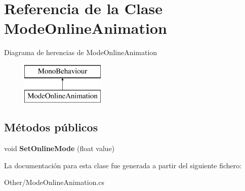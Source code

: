 \hypertarget{class_mode_online_animation}{}\section{Referencia de la Clase Mode\+Online\+Animation}
\label{class_mode_online_animation}
Diagrama de herencias de Mode\+Online\+Animation\begin{figure}[H]
\begin{center}
\leavevmode
\includegraphics[height=2.000000cm]{class_mode_online_animation}
\end{center}
\end{figure}
\subsection*{Métodos públicos}
\begin{DoxyCompactItemize}
\item 
\mbox{\label{class_mode_online_animation_adfb83f8ce5c4c077045b68f876b5334e}} 
void {\bfseries Set\+Online\+Mode} (float value)
\end{DoxyCompactItemize}


La documentación para esta clase fue generada a partir del siguiente fichero\+:\begin{DoxyCompactItemize}
\item 
Other/Mode\+Online\+Animation.\+cs\end{DoxyCompactItemize}
